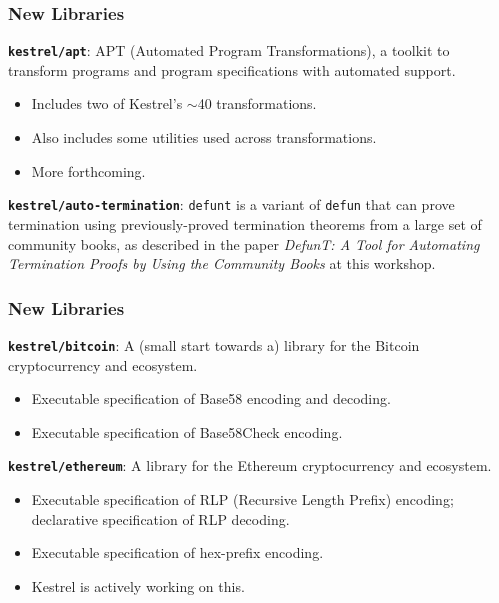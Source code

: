 \documentclass{beamer}
\newcommand{\code}[1]{\texttt{#1}}
\newcommand{\bookpath}[1]{\textbf{\code{#1}}}
\newcommand{\newlibtitle}{\frametitle{New Libraries}}
\newcommand{\separation}{\vspace*{1ex}}
\begin{document}

\begin{frame}

\newlibtitle

\bookpath{kestrel/apt}:
APT (Automated Program Transformations),
a toolkit
to transform programs and program specifications with automated support.
\begin{itemize}
\item
Includes two of Kestrel's $\sim$40 transformations.
\item
Also includes some utilities used across transformations.
\item
More forthcoming.
\end{itemize}

\separation

\bookpath{kestrel/auto-termination}:
\code{defunt} is a variant of \code{defun} that can prove termination
using previously-proved termination theorems from a large set of
community books, as described in the paper
\textit{DefunT: A Tool for Automating Termination Proofs
by Using the Community Books}
at this workshop.

\end{frame}


\begin{frame}

\newlibtitle

\bookpath{kestrel/bitcoin}:
A (small start towards a) library for the Bitcoin cryptocurrency and ecosystem.
\begin{itemize}
\item
Executable specification of Base58 encoding and decoding.
\item
Executable specification of Base58Check encoding.
\end{itemize}

\separation

\bookpath{kestrel/ethereum}:
A library for the Ethereum
cryptocurrency and ecosystem.
\begin{itemize}
\item
Executable specification of RLP (Recursive Length Prefix) encoding;
declarative specification of RLP decoding.
\item
Executable specification of hex-prefix encoding.
\item
Kestrel is actively working on this.
\end{itemize}

\end{frame}
\end{document}

